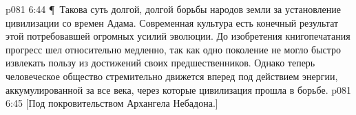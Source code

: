 \vs p081 6:44 \P\ Такова суть долгой, долгой борьбы народов земли за установление цивилизации со времен Адама. Современная культура есть конечный результат этой потребовавшей огромных усилий эволюции. До изобретения книгопечатания прогресс шел относительно медленно, так как одно поколение не могло быстро извлекать пользу из достижений своих предшественников. Однако теперь человеческое общество стремительно движется вперед под действием энергии, аккумулированной за все века, через которые цивилизация прошла в борьбе.
\vs p081 6:45 [Под покровительством Архангела Небадона.]
